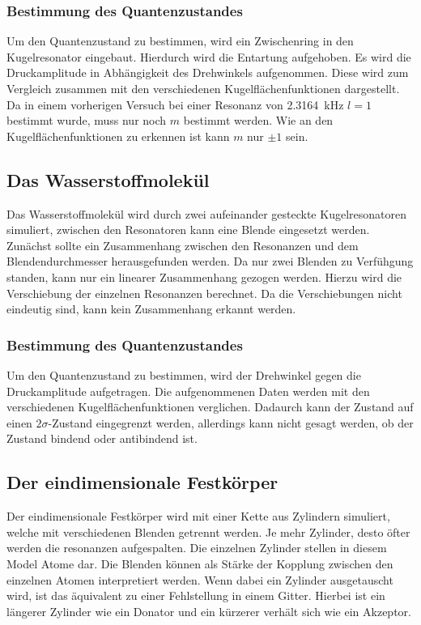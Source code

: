 \subsubsection{Bestimmung des Quantenzustandes}
Um den Quantenzustand zu bestimmen, wird ein Zwischenring in den Kugelresonator eingebaut. Hierdurch wird die 
Entartung aufgehoben. 
Es wird die Druckamplitude in Abhängigkeit des Drehwinkels aufgenommen. Diese wird zum Vergleich zusammen mit den verschiedenen
Kugelflächenfunktionen dargestellt.
Da in einem vorherigen Versuch bei einer Resonanz von \SI{2.3164}{\kilo\hertz} $l=1$ bestimmt wurde, muss nur noch $m$ bestimmt werden.
Wie an den Kugelflächenfunktionen zu erkennen ist kann $m$ nur $\pm 1 $ sein.
\subsection{Das Wasserstoffmolekül}
Das Wasserstoffmolekül wird durch zwei aufeinander gesteckte Kugelresonatoren simuliert, zwischen den Resonatoren kann eine Blende 
eingesetzt werden.
Zunächst sollte ein Zusammenhang zwischen den Resonanzen und dem Blendendurchmesser herausgefunden werden. Da nur zwei Blenden
zu Verfühgung standen, kann nur ein linearer Zusammenhang gezogen werden. Hierzu wird die Verschiebung der einzelnen 
Resonanzen berechnet. Da die Verschiebungen nicht eindeutig sind, kann kein Zusammenhang erkannt werden.
\subsubsection{Bestimmung des Quantenzustandes}
Um den Quantenzustand zu bestimmen, wird der Drehwinkel gegen die Druckamplitude aufgetragen. Die aufgenommenen Daten werden
mit den verschiedenen Kugelflächenfunktionen verglichen. Dadaurch kann der Zustand auf einen $2\sigma$-Zustand eingegrenzt werden, 
allerdings kann nicht gesagt werden, ob der Zustand bindend oder antibindend ist.
\subsection{Der eindimensionale Festkörper}
Der eindimensionale Festkörper wird mit einer Kette aus Zylindern simuliert, welche mit verschiedenen Blenden getrennt werden.
Je mehr Zylinder, desto öfter werden die resonanzen aufgespalten.
Die einzelnen Zylinder stellen in diesem Model Atome dar. Die Blenden können als Stärke der Kopplung zwischen den einzelnen 
Atomen interpretiert werden.
Wenn dabei ein Zylinder ausgetauscht wird, ist das äquivalent zu einer Fehlstellung in einem Gitter. Hierbei ist 
ein längerer Zylinder wie ein Donator und ein kürzerer verhält sich wie ein Akzeptor.